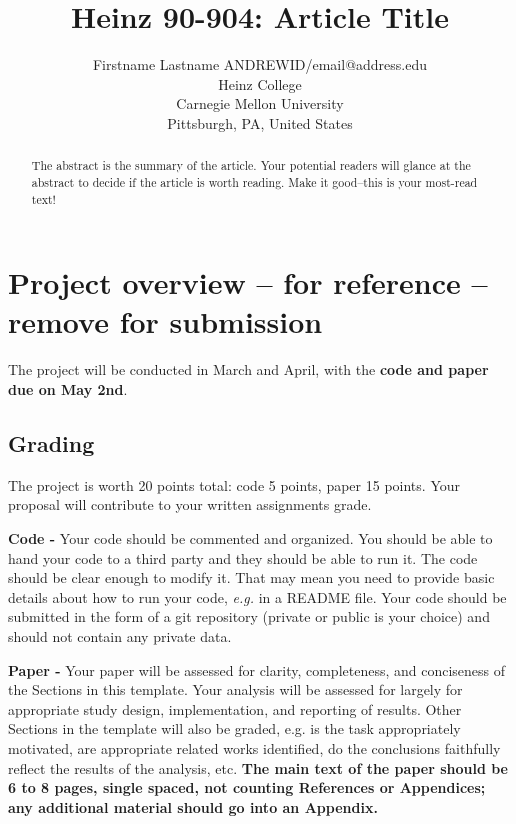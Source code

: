 \documentclass[twoside,11pt]{article}
\begin{document}
\title{Heinz 90-904: Article Title}

\author{\name Firstname Lastname \email ANDREWID/email@address.edu \\
       \addr Heinz College\\
       Carnegie Mellon University\\
       Pittsburgh, PA, United States
       } 

\maketitle

\begin{abstract}
  The abstract is the summary of the article. Your potential readers will glance at the abstract to decide
  if the article is worth reading. Make it good--this is your most-read text!  
\end{abstract}

\section{Project overview -- for reference -- remove for submission}

The project will be conducted in March and April, with the \textbf{code and paper due on May 2nd}.

\subsection{Grading}
The project is worth 20 points total: code 5 points, paper 15 points. Your proposal will contribute to your written assignments grade.


\textbf{Code -} Your code should be commented and organized. You should be able to hand your code to a third party and they should be able to run it. The code should be clear enough to modify it. That may mean you need to provide basic details about how to run your code, \emph{e.g.} in a README file. Your code should be submitted in the form of a git repository (private or public is your choice) and should not contain any private data. 

\textbf{Paper -} Your paper will be assessed for clarity, completeness, and conciseness of the Sections in this template. Your analysis will be assessed for largely for appropriate study design, implementation, and reporting of results. Other Sections in the template will also be graded, e.g. is the task appropriately motivated, are appropriate related works identified, do the conclusions faithfully reflect the results of the analysis, etc. \textbf{The main text of the paper should be 6 to 8 pages, single spaced, not counting References or Appendices; any additional material should go into an Appendix.}
\end{document}
